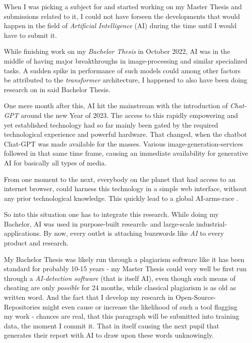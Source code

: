 When I was picking a subject for and started working on my Master Thesis and submissions related to it, I could not have forseen the developments that would happen in the field of \emph{Artificial Intelligence} (AI) during the time until I would have to submit it.

While finishing work on my \emph{Bachelor Thesis} \cite{bachelorThesis} in October 2022, AI was in the middle of having major breakthroughs in image-processing and similar specialized tasks. 
A sudden spike in performance of such models could among other factors be attributed to the \emph{transformer} architecture, I happened to also have been doing research on in said Bachelor Thesis.

One mere month after this, AI hit the mainstream with the introduction of \emph{Chat-GPT} \cite{chatGPT} around the new Year of 2023.
The access to this rapidly empowering and yet established technology had so far mainly been gated by the required technological experience and powerful hardware. 
That changed, when the chatbot Chat-GPT was made available for the masses. 
Various image-generation-services followed in that same time frame, causing an immediate availability for generative AI for basically all types of media.

From one moment to the next, everybody on the planet that had access to an internet browser, could harness this technology in a simple web interface, without any prior technological knowledge. 
This quickly lead to a global AI-arms-race \cite{aiBoom}.


So into this situation one has to integrate this research. 
While doing my Bachelor, AI was used in purpose-built research- and large-scale industrial-applications.
By now, every outlet is attaching buzzwords like \emph{AI} to every product and research.

My Bachelor Thesis was likely run through a plagiarism software like it has been standard for probably 10-15 years - my Master Thesis could very well be first run through a \emph{AI-detection software} (that is itself \glqq{}AI\grqq), even though such means of cheating are only \emph{possible} for 24 months, while classical plagiarism is as old as written word.
And the fact that I develop my research in Open-Source-Repositories might even cause or increase the likelihood of such a tool flagging my work - chances are real, that this paragraph will be submitted into training data, the moment I commit it.
That in itself causing the next pupil that generates their report with AI to draw upon these words unknowingly.\\


